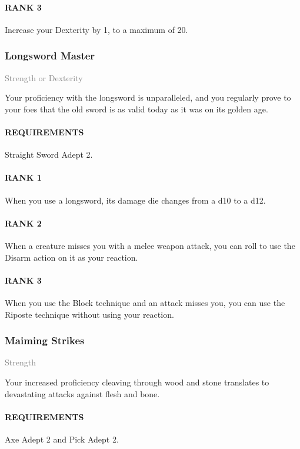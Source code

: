 \paragraph{RANK 3} Increase your Dexterity by 1, to a maximum of 20.

\subsubsection{Longsword Master} \label{feat::longswordmaster}
\small{\textcolor{gray}{Strength or Dexterity}}

\normalsize
Your proficiency with the longsword is unparalleled, and you regularly prove to your foes that the old sword is as valid today as it was on its golden age.
\paragraph{REQUIREMENTS} Straight Sword Adept 2.
\paragraph{RANK 1} When you use a longsword, its damage die changes from a d10 to a d12.
\paragraph{RANK 2} When a creature misses you with a melee weapon attack, you can roll to use the Disarm action on it as your reaction.
\paragraph{RANK 3} When you use the Block technique and an attack misses you, you can use the Riposte technique without using your reaction.

\subsubsection{Maiming Strikes} \label{feat::maimingstrikes}
\small{\textcolor{gray}{Strength}}

\normalsize
Your increased proficiency cleaving through wood and stone translates to devastating attacks against flesh and bone.
\paragraph{REQUIREMENTS} Axe Adept 2 and Pick Adept 2.
